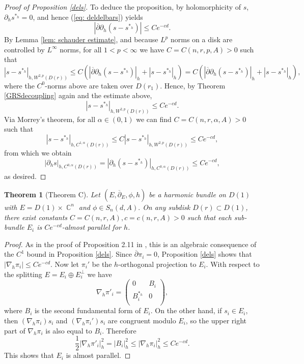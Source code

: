 \documentclass[10pt]{amsart}
\newtheorem{thm}{Theorem}[section]
\theoremstyle{definition}
\DeclareMathOperator{\C}{\mathbb{C}}
\begin{document}
\begin{proof}[Proof of Proposition \ref{dels}]
To deduce the proposition, by holomorphicity of $s$, $\partial_h s^{*_h}=0$, and hence (\ref{eq: deldelbars}) yields $$|\overline{\partial}\partial_h (s-s^{*_h})|\leq Ce^{-cd}.$$ By Lemma \ref{lem: schauder estimate}, and because $L^p$ norms on a disk are controlled by $L^\infty$ norms, for all $1<p<\infty$ we have $C=C(n,r,p,A)>0$ such that $$|s-s^{*_h}|_{h,W^{2,p}(D(r))}\leq C(|\overline{\partial}\partial_h (s-s^{*_h})|_{h}+|s-s^{*_h}|_{h})=C(|\overline{\partial}\partial_h (s-s^{*_h})|_{h}+|s-s^{*_h}|_{h}),$$ where the $C^0$-norms above are taken over $D(r_1).$ Hence, by Theorem \ref{GRSdecoupling} again and the estimate above, $$|s-s^{*_h}|_{h,W^{2,p}(D(r))}\leq Ce^{-cd}.$$ Via Morrey's theorem, for all $\alpha\in (0,1)$ we can find $C=C(n,r,\alpha,A)>0$ such that $$|s-s^{*_h}|_{h,C^{1,\alpha}(D(r))}\leq C|s-s^{*_h}|_{h,W^{2,p}(D(r))}\leq Ce^{-cd},$$ from which we obtain $$|\partial_h s|_{h,C^{0,\alpha}(D(r))}=|\partial_h (s-s^{*_h})|_{h,C^{0,\alpha}(D(r))}\leq Ce^{-cd},$$ as desired. 
    \end{proof}

\begin{thm}[Theorem C]
    Let $(E,\overline{\partial}_E,\phi,h)$ be a harmonic bundle on $D(1)$ with $E=D(1)\times \C^n$ and $\phi\in S_n(d,A).$
    On any subdisk $D(r)\subset D(1)$, there exist constants $C=C(n,r ,A), c=c(n,r,A)>0$ such that each sub-bundle $E_i$ is $Ce^{-cd}$-almost parallel for $h$.
\end{thm}

\begin{proof}
As in the proof of Proposition 2.11 in \cite{Mo}, this is an algebraic consequence of the $C^1$ bound in Proposition \ref{dels}. Since $\overline{\partial} \pi_i = 0$, Proposition \ref{dels} shows that $|\nabla_h \pi_i| \leq C e^{-cd}$. Now let $\pi_i'$ be the $h$-orthogonal projection to $E_i$. With respect to the splitting $E = E_i \oplus E_i^\perp$ we have
\[
\nabla_h \pi'_i = \begin{pmatrix}
    0 & B_i \\
    B_i^{*_h} & 0 \\
\end{pmatrix},
\]
where $B_i$ is the second fundamental form of $E_i$. On the other hand, if $s_i \in E_i$, then $(\nabla_h \pi_i)s_i$ and $(\nabla_h \pi_i')s_i$ are congruent modulo $E_i$, so the upper right part of $\nabla_h \pi_i$ is also equal to $B_i$. Therefore 
\[
\frac{1}{2}|\nabla_h \pi'_i|^2_h =  |B_i|^2_h \leq  |\nabla_h \pi_i|^2_h \leq Ce^{-cd}.
\]
This shows that $E_i$ is almost parallel.

\end{proof}
\end{document}
